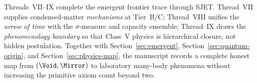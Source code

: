 \begin{remark}\label{rmk:thread-7-9-closure}
Threads~VII--IX complete the emergent frontier trace through SJET.
Thread~VII supplies condensed-matter \emph{mechanisms} at Tier~B/C;
Thread~VIII unifies the \emph{arrow of time} with the $\sigma$-measure and
capacity ensemble; Thread~IX draws the \emph{phenomenology boundary} so that
Class~V physics is hierarchical closure, not hidden postulation. Together with
Section~\ref{sec:emergent}, Section~\ref{sec:quantum-origin}, and
Section~\ref{sec:physics-map}, the manuscript records a complete honest map from
$(\Void,\Mirror)$ to laboratory many-body phenomena without increasing the
primitive axiom count beyond two.
\end{remark}